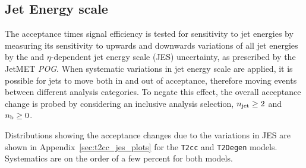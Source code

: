 





\subsection{Jet Energy scale}

The acceptance times signal efficiency is tested for sensitivity to jet energies by measuring
its sensitivity to upwards and downwards variations of all jet energies by the 
\Pt and $\eta\text{-dependent}$ jet energy scale (JES) uncertainty, as prescribed by 
the JetMET \emph{POG}. When systematic variations in jet
energy scale are applied, it is possible for jets to move both in and out of
acceptance, therefore moving events between different analysis categories.
To negate this effect, the overall acceptance change is probed by
considering an inclusive analysis selection, $n_{\text{jet}} \geq 2$ and $n_{\text{b}} \geq 0$. 

Distributions showing the acceptance changes due to the variations in JES are 
shown in Appendix~\ref{sec:t2cc_jes_plots} for the \texttt{T2cc} and
\texttt{T2Degen} models. Systematics are on the order of a few percent for both
models.


